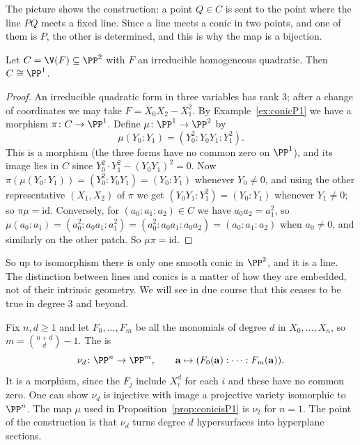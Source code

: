 The picture shows the construction: a point $Q \in C$ is sent to the point where the line $PQ$ meets a fixed line. Since a line meets a conic in two points, and one of them is $P$, the other is determined, and this is why the map is a bijection.

\begin{proposition}\label{prop:conicisP1}
	Let $C = \V(F) \subseteq \PP^2$ with $F$ an irreducible homogeneous quadratic. Then $C \cong \PP^1$.
\end{proposition}

\begin{proof}
	An irreducible quadratic form in three variables has rank $3$; after a change of coordinates we may take $F = X_0X_2 - X_1^2$. By Example~\ref{ex:conicP1} we have a morphism $\pi \colon C \to \PP^1$. Define $\mu \colon \PP^1 \to \PP^2$ by
	$$\mu(Y_0:Y_1) = (Y_0^2 : Y_0Y_1 : Y_1^2).$$
	This is a morphism (the three forms have no common zero on $\PP^1$), and its image lies in $C$ since $Y_0^2\cdot Y_1^2 - (Y_0Y_1)^2 = 0$. Now $\pi(\mu(Y_0:Y_1)) = (Y_0^2 : Y_0Y_1) = (Y_0:Y_1)$ whenever $Y_0 \neq 0$, and using the other representative $(X_1,X_2)$ of $\pi$ we get $(Y_0Y_1 : Y_1^2) = (Y_0:Y_1)$ whenever $Y_1 \neq 0$; so $\pi\mu = \mathrm{id}$. Conversely, for $(a_0:a_1:a_2) \in C$ we have $a_0a_2 = a_1^2$, so $\mu(a_0:a_1) = (a_0^2 : a_0a_1 : a_1^2) = (a_0^2 : a_0a_1 : a_0a_2) = (a_0:a_1:a_2)$ when $a_0 \neq 0$, and similarly on the other patch. So $\mu\pi = \mathrm{id}$.
\end{proof}

So up to isomorphism there is only one smooth conic in $\PP^2$, and it is a line. The distinction between lines and conics is a matter of how they are embedded, not of their intrinsic geometry. We will see in due course that this ceases to be true in degree $3$ and beyond.

\begin{example}
	Fix $n,d \geq 1$ and let $F_0,\dots,F_m$ be all the monomials of degree $d$ in $X_0,\dots,X_n$, so $m = \binom{n+d}{d}-1$. The  is
	$$\nu_d \colon \PP^n \to \PP^m, \qquad \mathbf a \mapsto (F_0(\mathbf a) : \cdots : F_m(\mathbf a)).$$
	It is a morphism, since the $F_j$ include $X_i^d$ for each $i$ and these have no common zero. One can show $\nu_d$ is injective with image a projective variety isomorphic to $\PP^n$. The map $\mu$ used in Proposition~\ref{prop:conicisP1} is $\nu_2$ for $n=1$. The point of the construction is that $\nu_d$ turns degree $d$ hypersurfaces into hyperplane sections.
\end{example}

